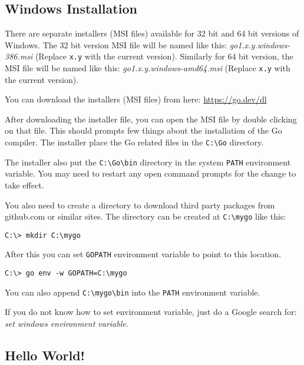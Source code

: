 \subsection{Windows Installation}

There are separate installers (MSI files) available for
32 bit and 64 bit versions of Windows. The 32 bit version MSI file will be named
like this: \textit{go1.x.y.windows-386.msi} (Replace \texttt{x.y} with the
current version). Similarly for 64 bit version, the MSI file will be named like
this: \textit{go1.x.y.windows-amd64.msi} (Replace \texttt{x.y} with the current
version).

You can download the installers (MSI files) from here:
\url{https://go.dev/dl}

After downloading the installer file, you can open the MSI file by double
clicking on that file. This should prompts few things about the installation of
the Go compiler. The installer place the Go related files in
the \texttt{C:\textbackslash{}Go} directory.

The installer also put the \texttt{C:\textbackslash{}Go\textbackslash{}bin}
directory in the system \texttt{PATH} environment variable. You may need to
restart any open command prompts for the change to take effect.

You also need to create a directory to download third party packages from
github.com or similar sites. The directory can be created at
\texttt{C:\textbackslash{}mygo} like this:

\begin{lstlisting}[numbers=none]
C:\> mkdir C:\mygo
\end{lstlisting}

After this you can set \texttt{GOPATH} environment variable to point to this
location.

\begin{lstlisting}[numbers=none]
C:\> go env -w GOPATH=C:\mygo
\end{lstlisting}

You can also append \texttt{C:\textbackslash{}mygo\textbackslash{}bin} into
the \texttt{PATH} environment variable.

If you do not know how to set environment variable, just do a Google search
for: \textit{set windows environment variable}.

\subsection{Hello World!}


